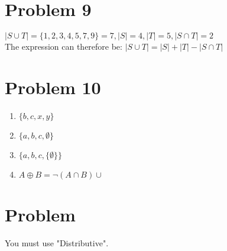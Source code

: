 \documentclass[english,10pt,a4paper]{article}
\begin{document}
\section*{Problem 9}
$|S \cup T| = \{1,2,3,4,5,7,9\} = 7, |S|=4, |T|=5, |S\cap T|=2$\\
The expression can therefore be: $|S \cup T| = |S|+|T|-|S\cap T|$


\section*{Problem 10}
\begin{enumerate}[a]
\item $\{b, c, x, y\}$
\item $\{a, b, c, \emptyset\}$
\item $\{a, b, c, \{\emptyset\}\}$
\item $A \oplus B = \neg(A \cap B) \cup $
\end{enumerate}



\section*{Problem}
You must use "Distributive".
\end{document}

